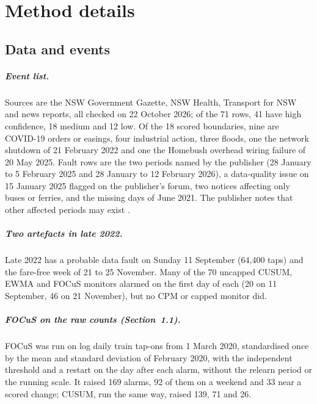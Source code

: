 \chapter{Method details}\label{app:details}
\setcounter{equation}{0}

\section{Data and events}\label{app:d-data}

\paragraph{Event list.} Sources are the NSW Government Gazette, NSW Health, Transport for NSW and news reports, all checked on 22 October 2026; of the 71 rows, 41 have high confidence, 18 medium and 12 low. Of the 18 scored boundaries, nine are COVID-19 orders or easings, four industrial action, three floods, one the network shutdown of 21 February 2022 and one the Homebush overhead wiring failure of 20 May 2025. Fault rows are the two periods named by the publisher (28 January to 5 February 2025 and 28 January to 12 February 2026), a data-quality issue on 15 January 2025 flagged on the publisher's forum, two notices affecting only buses or ferries, and the missing days of June 2021. The publisher notes that other affected periods may exist \citep{tfnsw2026opaldoc}.

\paragraph{Two artefacts in late 2022.} Late 2022 has a probable data fault on Sunday 11 September (64,400 taps) and the fare-free week of 21 to 25 November. Many of the 70 uncapped CUSUM, EWMA and FOCuS monitors alarmed on the first day of each (20 on 11 September, 46 on 21 November), but no CPM or capped monitor did.

\paragraph{FOCuS on the raw counts (Section~1.1).} FOCuS was run on log daily train tap-ons from 1 March 2020, standardised once by the mean and standard deviation of February 2020, with the independent threshold and a restart on the day after each alarm, without the relearn period or the running scale. It raised 169 alarms, 92 of them on a weekend and 33 near a scored change; CUSUM, run the same way, raised 139, 71 and 26.

